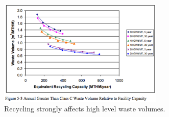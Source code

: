 \begin{figure}[htbp!]
  \begin{center}
    \includegraphics[width=0.7\textwidth]{carter_volume.eps}
  \end{center}
  \caption{Recycling strongly affects high level waste volumes\cite{carter_us_2011}.}
  \label{fig:carter_volume}
\end{figure}

